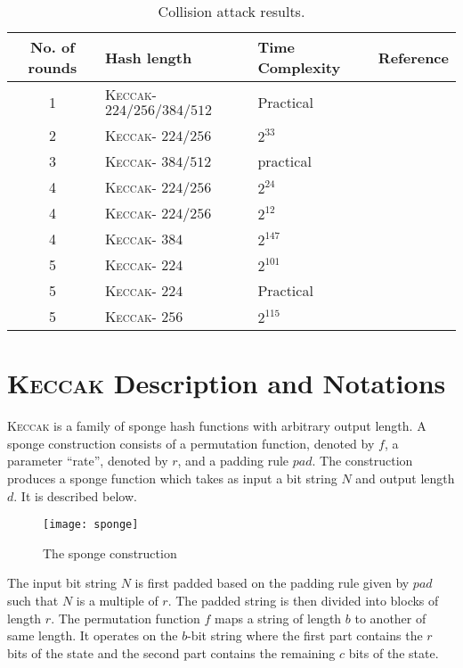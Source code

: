 \documentclass[runningheads]{llncs}
\newcommand{\Keccak}{\mbox{\textsc{Keccak}}}
\begin{document}
\begin{table}
\begin{center}
\caption{Collision attack results.}\label{tab2}
\begin{tabular}{|c|l|l|c|}
\hline
No. of rounds & Hash length & Time Complexity & Reference\\
\hline
1 & \Keccak - $224/256/384/512$ & Practical & ~\cite{kumar2018cryptanalysis} \\
2 & \Keccak - $224/256$ & $2^{33}$ & ~\cite{naya2011practical}\\
3 & \Keccak - $384/512$ & practical & ~\cite{dinur2013collision}\\
4 & \Keccak - $224/256$ & $2^{24}$ & ~\cite{dinur2012new}\\
4 & \Keccak - $224/256$ & $2^{12}$ & ~\cite{qiao2017new}\\
4 & \Keccak - $384$ & $2^{147}$ & ~\cite{dinur2013collision}\\
5 & \Keccak - $224$ & $2^{101}$ & ~\cite{qiao2017new}\\
5 & \Keccak - $224$ & Practical & ~\cite{song2017non}\\
5 & \Keccak - $256$ & $2^{115}$ & ~\cite{dinur2013collision}\\
\hline
\end{tabular}
\end{center}
\end{table}

\section{\Keccak{} Description and Notations}
\Keccak{} is a family of sponge hash functions with arbitrary output length. A sponge construction consists of a permutation function, denoted by $f$, a parameter ``rate'', denoted by $r$, and a padding rule ${pad}$. The construction 
produces a sponge function which takes as input a bit string $N$ and output length $d$. 
It is described below.

\begin{figure}
\texttt{[image: sponge]}
\caption{The sponge construction~\cite{bertoni2011cryptographic}\label{sponge}}
\end{figure}
The input bit string $N$ is first padded based on the padding rule given by $pad$ such that $N$ is a multiple of $r$. The padded string is then divided into blocks of length $r$. The permutation function $f$ maps a string of length $b$ to another of same length. It operates on the $b$-bit string where the first part contains the $r$ bits of the state and the second part contains the remaining $c$ bits of the state.
\end{document}
